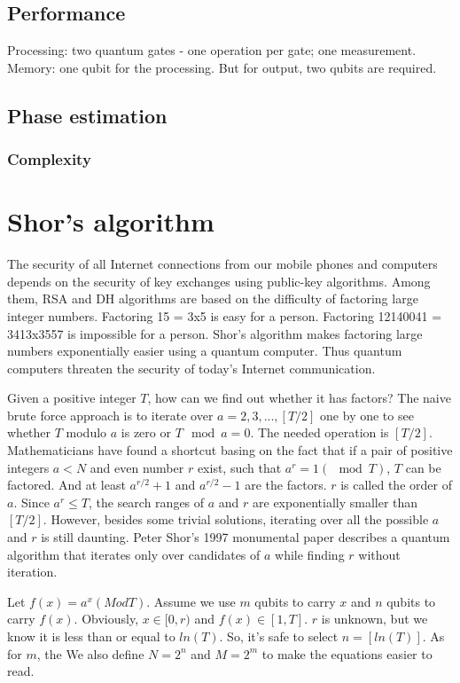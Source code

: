 \documentclass[oneside, letter, 12pt]{book}
\begin{document}
\subsection{Performance}
Processing: two quantum gates - one operation per gate; one measurement.
Memory: one qubit for the processing. But for output, two qubits are required.

\subsection{Phase estimation}
\subsubsection{Complexity}

\section{Shor's algorithm}
The security of all Internet connections from our mobile phones and computers depends on the security of key exchanges using public-key algorithms. Among them, RSA and DH algorithms are based on the difficulty of factoring large integer numbers. Factoring 15 = 3x5 is easy for a person. Factoring 12140041 = 3413x3557 is impossible for a person. Shor's algorithm makes factoring large numbers exponentially easier using a quantum computer. Thus quantum computers threaten the security of today's Internet communication.

Given a positive integer $T$, how can we find out whether it has factors? The naive brute force approach is to iterate over $a=2, 3, ..., [T/2]$ one by one to see whether $T$ modulo $a$ is zero or $T \mod a = 0$. The needed operation is $[T/2]$. Mathematicians have found a shortcut basing on the fact that if a pair of positive integers $a < N$ and even number $r$ exist, such that $a^r = 1(\mod T)$, $T$ can be factored. And at least $a^{r/2}+1$ and $a^{r/2}-1$ are the factors. $r$ is called the order of $a$. Since $a^r \leq T$, the search ranges of $a$ and $r$ are exponentially smaller than $[T/2]$. However, besides some trivial solutions, iterating over all the possible $a$ and $r$ is still daunting. Peter Shor's 1997 monumental paper\cite{1997Shor} describes a quantum algorithm that iterates only over candidates of $a$ while finding $r$ without iteration.

Let $f(x) = a^x (Mod T)$. Assume we use $m$ qubits to carry $x$ and $n$ qubits to carry $f(x)$. Obviously, $x\in [0, r)$ and $f(x) \in [1, T]$. $r$ is unknown, but we know it is less than or equal to $ln(T)$. So, it's safe to select $n = [ln(T)]$. As for $m$, the We also define $N=2^n$ and $M=2^m$ to make the equations easier to read.
\end{document}
